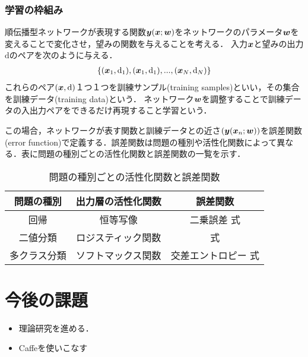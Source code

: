 \documentclass[a4paper,10pt]{jsarticle}
\def\vec#1{\mbox{\boldmath$#1$}}
\begin{document}
\subsubsection{学習の枠組み}
順伝播型ネットワークが表現する関数$\vec{y}(\vec{x};\vec{w})$をネットワークのパラメータ$\vec{w}$を変えることで変化させ，望みの関数を与えることを考える．
入力$\vec{x}$と望みの出力$\mathrm{d}$のペアを次のように与える．
\begin{eqnarray}
 \{(\vec{x}_{1},\mathrm{d}_{1}),(\vec{x}_{1},\mathrm{d}_{1}),...,(\vec{x}_{N},\mathrm{d}_{N})\}
\end{eqnarray}
これらのペア$(\vec{x},\mathrm{d})$１つ１つを訓練サンプル(training samples)といい，その集合を訓練データ(training data)という．
ネットワーク$\vec{w}$を調整することで訓練データの入出力ペアをできるだけ再現すること学習という．

この場合，ネットワークが表す関数と訓練データとの近さ$(\vec{y}(\vec{x}_{n};\vec{w}))$を誤差関数(error function)で定義する．誤差関数は問題の種別や活性化関数によって異なる．表に問題の種別ごとの活性化関数と誤差関数の一覧を示す．

\begin{table}[htb]
\centering
\caption{問題の種別ごとの活性化関数と誤差関数}
\begin{tabular}[bt]{|c|c|c|}\hline
 問題の種別& 出力層の活性化関数&誤差関数 \\ \hline \hline
 回帰&恒等写像 & 二乗誤差 式\\
 二値分類& ロジスティック関数& 式\\ 
 多クラス分類& ソフトマックス関数& 交差エントロピー 式\\ \hline
\end{tabular}
\end{table}


\section{今後の課題}
\begin{itemize}
 \item 理論研究を進める．
 \item Caffeを使いこなす
\end{itemize}
\end{document}
